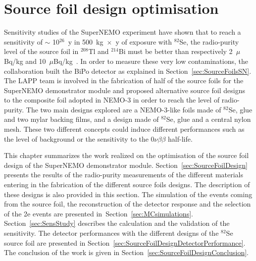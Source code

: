\documentclass[main.tex]{subfiles}
\begin{document}
\chapter{Source foil design optimisation}

 


\NI Sensitivity studies of the SuperNEMO experiment have shown that to reach a sensitivity of $\sim$ 10$^{\text{26}}$~y in 500~kg~$\times$~y of exposure with $^{\text{82}}$Se, the radio-purity level of the source foil in $^{\text{208}}$Tl and $^{\text{214}}$Bi must be better than respectively 2~$\mu$Bq/kg and 10~$\mu$Bq/kg~\cite{PhysicsCaseSuperNEMO}. In order to measure these very low contaminations, the collaboration built the BiPo detector as explained in Section~\ref{sec:SourceFoilsSN}. The LAPP team is involved in the fabrication of half of the source foils for the SuperNEMO demonstrator module and proposed alternative source foil designs to the composite foil adopted in NEMO-3 in order to reach the level of radio-purity. The two main designs explored are a NEMO-3-like foils made of $^{\text{82}}$Se, glue and two mylar backing films, and a design made of $^{\text{82}}$Se, glue and a central nylon mesh. These two different concepts could induce different performances such as the level of background or the sensitivity to the 0$\nu\beta\beta$ half-life. 



\bigskip


\NI This chapter summarizes the work realized on the optimisation of the source foil design of the SuperNEMO demonstrator module. Section~\ref{sec:SourceFoilDesign} presents the results of the radio-purity measurements of the different materials entering in the fabrication of the different source foils designs. The description of these designs is also provided in this section. The simulation of the events coming from the source foil, the reconstruction of the detector response and the selection of the 2e events are presented in~Section~\ref{sec:MCsimulations}. Section~\ref{sec:SensStudy} describes the calculation and the validation of the sensitivity. The detector performances with the different designs of the $^{\text{82}}$Se source foil are presented in Section~\ref{sec:SourceFoilDesignDetectorPerformance}. The conclusion of the work is given in Section~\ref{sec:SourceFoilDesignConclusion}.
\end{document}
